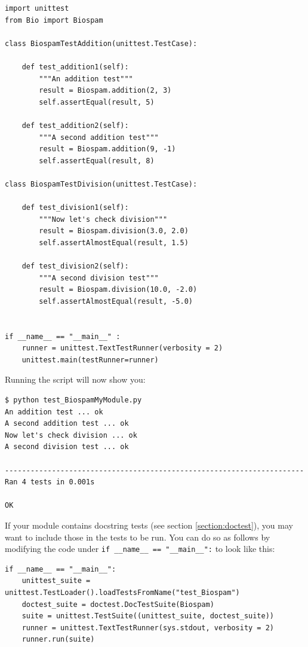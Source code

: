 \documentclass{report}
\begin{document}
\begin{itemize}
\begin{verbatim}
import unittest
from Bio import Biospam

class BiospamTestAddition(unittest.TestCase):

    def test_addition1(self):
        """An addition test"""
        result = Biospam.addition(2, 3)
        self.assertEqual(result, 5)

    def test_addition2(self):
        """A second addition test"""
        result = Biospam.addition(9, -1)
        self.assertEqual(result, 8)

class BiospamTestDivision(unittest.TestCase):

    def test_division1(self):
        """Now let's check division"""
        result = Biospam.division(3.0, 2.0)
        self.assertAlmostEqual(result, 1.5)

    def test_division2(self):
        """A second division test"""
        result = Biospam.division(10.0, -2.0)
        self.assertAlmostEqual(result, -5.0)


if __name__ == "__main__" :
    runner = unittest.TextTestRunner(verbosity = 2)
    unittest.main(testRunner=runner)
\end{verbatim}

        Running the script will now show you:

\begin{verbatim}
$ python test_BiospamMyModule.py
An addition test ... ok
A second addition test ... ok
Now let's check division ... ok
A second division test ... ok

----------------------------------------------------------------------
Ran 4 tests in 0.001s

OK
\end{verbatim}
\end{itemize}

If your module contains docstring tests (see section \ref{section:doctest}),
you may want to include those in the tests to be run. You can do so as
follows by modifying the code under \verb|if __name__ == "__main__":|
to look like this:

\begin{verbatim}
if __name__ == "__main__":
    unittest_suite = unittest.TestLoader().loadTestsFromName("test_Biospam")
    doctest_suite = doctest.DocTestSuite(Biospam)
    suite = unittest.TestSuite((unittest_suite, doctest_suite))
    runner = unittest.TextTestRunner(sys.stdout, verbosity = 2)
    runner.run(suite)
\end{verbatim}
\end{document}
